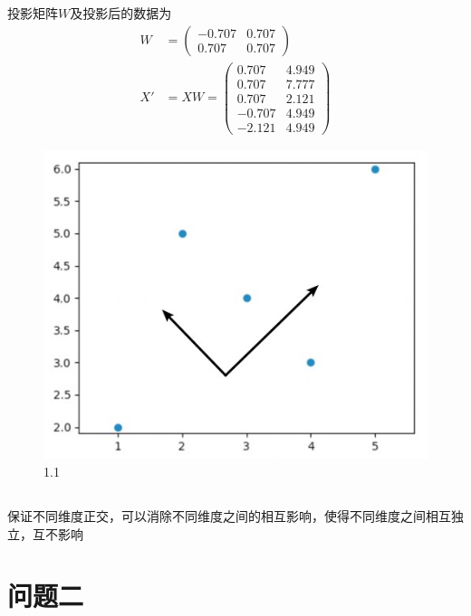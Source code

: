 \documentclass[12pt, a4paper]{article}
\begin{document}
投影矩阵$W$及投影后的数据为
\begin{align*}
    W&=\begin{pmatrix}
        -0.707&0.707\\0.707&0.707
    \end{pmatrix}\\
    X'&=XW=\begin{pmatrix}
        0.707&4.949\\0.707&7.777\\0.707&2.121\\-0.707&4.949\\-2.121&4.949
    \end{pmatrix}
\end{align*}

\begin{figure}
    \centering
    \includegraphics*{img/a5_1.jpg}
    \caption{1.1}
\end{figure}

\subsection{}

保证不同维度正交，可以消除不同维度之间的相互影响，使得不同维度之间相互独立，互不影响


\section{问题二}

\subsection{}
\end{document}
